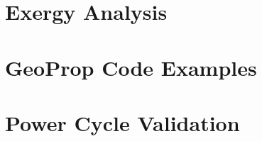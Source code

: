 \documentclass{Configuration_Files/PoliMi3i_thesis}
\begin{document}
\chapter{Exergy Analysis}
\label{ch:appendix_c}%
   

\chapter{GeoProp Code Examples}
\label{ch:appendix_d}%
   

%    

\chapter{Power Cycle Validation}
\label{ch:appendix_f}%
   


\cleardoublepage
\end{document}
